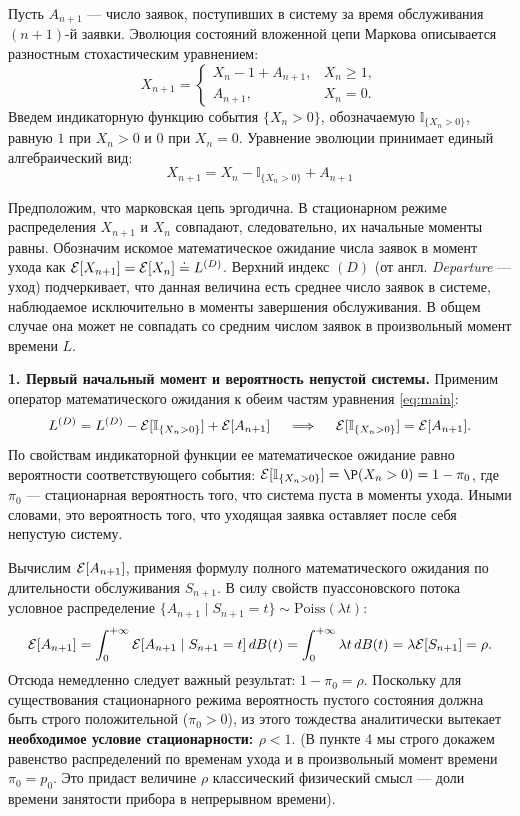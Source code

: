 \begin{tproof}
Пусть $A_{n+1}$ — число заявок, поступивших в систему за время обслуживания $(n+1)$-й заявки. Эволюция состояний вложенной цепи Маркова описывается разностным стохастическим уравнением:
$$
X_{n+1} = 
\begin{cases} 
X_n - 1 + A_{n+1}, & X_n \ge 1, \\ 
A_{n+1}, & X_n = 0.
\end{cases}
$$
Введем индикаторную функцию события $\{X_n > 0\}$, обозначаемую $\mathbb{I}_{\{X_n > 0\}}$, равную $1$ при $X_n > 0$ и $0$ при $X_n = 0$. Уравнение эволюции принимает единый алгебраический вид:
\begin{equation}\label{eq:main}
    X_{n+1} = X_n - \mathbb{I}_{\{X_n > 0\}} + A_{n+1} \tag{$*$}
\end{equation}

Предположим, что марковская цепь эргодична. В стационарном режиме распределения $X_{n+1}$ и $X_n$ совпадают, следовательно, их начальные моменты равны. Обозначим искомое математическое ожидание числа заявок в момент ухода как $\mathcal{E}[X_{n+1}] = \mathcal{E}[X_n] \doteq L^{(D)}$. Верхний индекс $(D)$ (от англ. \textit{Departure} — уход) подчеркивает, что данная величина есть среднее число заявок в системе, наблюдаемое исключительно в моменты завершения обслуживания. В общем случае она может не совпадать со средним числом заявок в произвольный момент времени $L$.

\textbf{1. Первый начальный момент и вероятность непустой системы.}
Применим оператор математического ожидания к обеим частям уравнения \eqref{eq:main}:
$$
L^{(D)} = L^{(D)} - \mathcal{E}[\mathbb{I}_{\{X_n > 0\}}] + \mathcal{E}[A_{n+1}] \quad \implies \quad \mathcal{E}[\mathbb{I}_{\{X_n > 0\}}] = \mathcal{E}[A_{n+1}].
$$
По свойствам индикаторной функции ее математическое ожидание равно вероятности соответствующего события: $\E[\mathbb{I}_{\{X_n > 0\}}] = \P(X_n > 0) = 1 - \pi_0$, где $\pi_0$ — стационарная вероятность того, что система пуста в моменты ухода. Иными словами, это вероятность того, что уходящая заявка оставляет после себя непустую систему.

Вычислим $\mathcal{E}[A_{n+1}]$, применяя формулу полного математического ожидания по длительности обслуживания $S_{n+1}$. В силу свойств пуассоновского потока условное распределение $\{A_{n+1} \mid S_{n+1} = t\} \sim \text{Poiss}(\lambda t)$:
$$
\mathcal{E}[A_{n+1}] = \int_{0}^{+\infty} \mathcal{E}[A_{n+1} \mid S_{n+1} = t] \, dB(t) = \int_{0}^{+\infty} \lambda t \, dB(t) = \lambda \mathcal{E}[S_{n+1}] = \rho.
$$
Отсюда немедленно следует важный результат: $1 - \pi_0 = \rho$. Поскольку для существования стационарного режима вероятность пустого состояния должна быть строго положительной ($\pi_0 > 0$), из этого тождества аналитически вытекает \textbf{необходимое условие стационарности: $\rho < 1$}. (В пункте 4 мы строго докажем равенство распределений по временам ухода и в произвольный момент времени $\pi_0 = p_0$. Это придаст величине $\rho$ классический физический смысл — доли времени занятости прибора в непрерывном времени).


\end{tproof}
